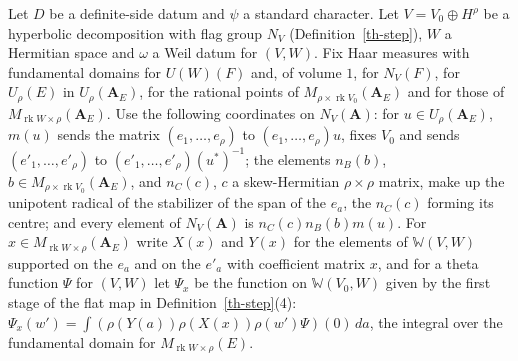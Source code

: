 \begin{lemma}[Unfolding]\label{th-unfolding}
Let $D$ be a definite-side datum and $\psi$ a standard character. Let
$V=V_0\oplus H^\rho$ be a hyperbolic decomposition with flag group $N_V$
(Definition~\ref{th-step}), $W$ a Hermitian space and $\omega$ a Weil datum for
$(V,W)$. Fix Haar measures with fundamental domains for $U(W)(F)$ and, of
volume $1$, for $N_V(F)$, for $U_\rho(E)$ in $U_\rho(\mathbf A_E)$, for the
rational points of $M_{\rho\times\operatorname{rk}V_0}(\mathbf A_E)$ and for
those of $M_{\operatorname{rk}W\times\rho}(\mathbf A_E)$. Use the following
coordinates on $N_V(\mathbf A)$: for $u\in U_\rho(\mathbf A_E)$, $m(u)$ sends
the matrix $(e_1,\ldots,e_\rho)$ to $(e_1,\ldots,e_\rho)u$, fixes $V_0$ and
sends $(e'_1,\ldots,e'_\rho)$ to $(e'_1,\ldots,e'_\rho)(u^*)^{-1}$; the elements
$n_B(b)$, $b\in M_{\rho\times\operatorname{rk}V_0}(\mathbf A_E)$, and $n_C(c)$,
$c$ a skew-Hermitian $\rho\times\rho$ matrix, make up the unipotent radical of
the stabilizer of the span of the $e_a$, the $n_C(c)$ forming its centre; and
every element of $N_V(\mathbf A)$ is $n_C(c)n_B(b)m(u)$. For
$x\in M_{\operatorname{rk}W\times\rho}(\mathbf A_E)$ write $X(x)$ and $Y(x)$
for the elements of $\mathbb W(V,W)$ supported on the $e_a$ and on the $e'_a$
with coefficient matrix $x$, and for a theta function $\Psi$ for $(V,W)$ let
$\Psi_x$ be the function on $\mathbb W(V_0,W)$ given by the first stage of the
flat map in Definition~\ref{th-step}(4):
$\Psi_x(w')=\int(\rho(Y(a))\rho(X(x))\rho(w')\Psi)(0)\,da$, the integral over
the fundamental domain for $M_{\operatorname{rk}W\times\rho}(E)$.


\end{lemma}
